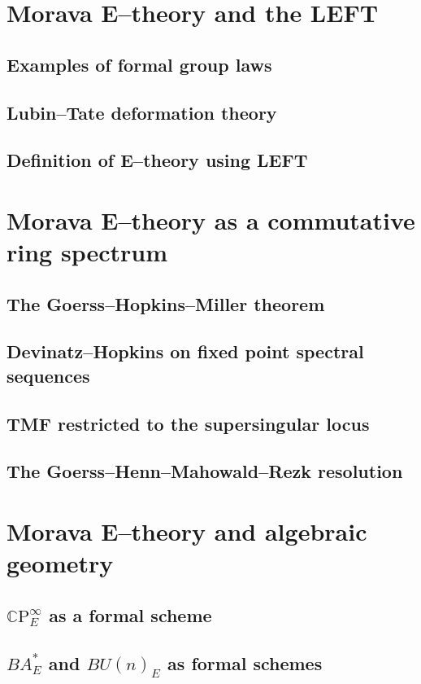 \section{Morava E--theory and the LEFT}
    \subsection{Examples of formal group laws}
    \subsection{Lubin--Tate deformation theory}
    \subsection{Definition of E--theory using LEFT}

\section{Morava E--theory as a commutative ring spectrum}
    \subsection{The Goerss--Hopkins--Miller theorem}
    \subsection{Devinatz--Hopkins on fixed point spectral sequences}
    \subsection{TMF restricted to the supersingular locus}
    \subsection{The Goerss--Henn--Mahowald--Rezk resolution}

\section{Morava E--theory and algebraic geometry}
    \subsection{$\mathbb C \mathrm P^\infty_E$ as a formal scheme}
    \subsection{$BA^*_E$ and $BU(n)_E$ as formal schemes}

